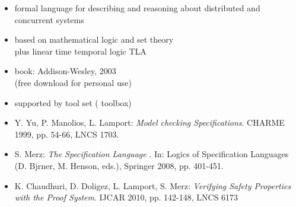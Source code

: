 \begin{frame}
\begin{minipage}{.7\linewidth}
    \begin{small}
    \begin{itemize}
    \item formal language for describing and reasoning about
      distributed and concurrent systems
\medskip
    \item based on mathematical logic and set theory\\
      plus linear time temporal logic TLA
\medskip
    \item book: Addison-Wesley, 2003\\
      (free download for personal use)
\medskip
    \item supported by tool set (\tlaplus{} toolbox)      
    \end{itemize}
    \end{small}
  \end{minipage}

  \pause
  \bigskip


  \begin{footnotesize}
  \begin{itemize}
  \item Y. Yu, P. Manolios, L. Lamport: \emph{Model checking \tlaplus{}
      Specifications}. CHARME 1999, pp. 54-66, LNCS 1703.
  \item S. Merz: \emph{The Specification Language \tlaplus}. In: Logics of
    Specification Languages (D. Bj{\slasho}rner, M. Henson, eds.), Springer
    2008, pp. 401-451.
  \item K. Chaudhuri, D. Doligez, L. Lamport, S. Merz: \emph{Verifying Safety
    Properties with the \tlaplus{} Proof System}. IJCAR 2010, pp. 142-148, LNCS 6173
  \end{itemize}
  \end{footnotesize}
\end{frame}
